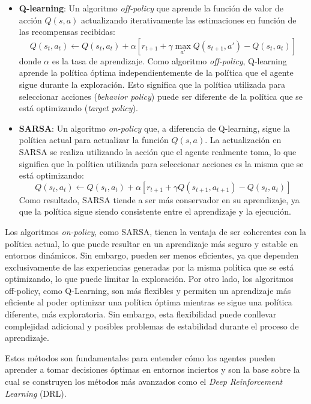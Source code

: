 \documentclass[a4paper,12pt]{report}
\begin{document}
\begin{itemize}
    \item \textbf{Q-learning}: Un algoritmo \textit{off-policy} que aprende la función de valor de 
    acción \(Q(s, a)\) actualizando iterativamente las estimaciones en función de las recompensas recibidas:
    \[
    Q(s_t, a_t) \leftarrow Q(s_t, a_t) + \alpha \left[r_{t+1} + \gamma \max_{a'} Q(s_{t+1}, a') - Q(s_t, a_t)\right]
    \]
    donde \(\alpha\) es la tasa de aprendizaje. Como algoritmo \textit{off-policy}, Q-learning aprende la 
    política óptima independientemente de la política que el agente sigue durante la exploración. 
    Esto significa que la política utilizada para seleccionar acciones (\textit{behavior policy}) 
    puede ser diferente de la política que se está optimizando (\textit{target policy}).

    \item \textbf{SARSA}: Un algoritmo \textit{on-policy} que, a diferencia de Q-learning, sigue la 
    política actual para actualizar la función \(Q(s, a)\). La actualización en SARSA se realiza 
    utilizando la acción que el agente realmente toma, lo que significa que la política utilizada 
    para seleccionar acciones es la misma que se está optimizando:
    \[
    Q(s_t, a_t) \leftarrow Q(s_t, a_t) + \alpha \left[r_{t+1} + \gamma Q(s_{t+1}, a_{t+1}) - Q(s_t, a_t)\right]
    \]
    Como resultado, SARSA tiende a ser más conservador en su aprendizaje, ya que la política sigue 
    siendo consistente entre el aprendizaje y la ejecución.

\end{itemize}


Los algoritmos \textit{on-policy}, como SARSA, tienen la ventaja de ser coherentes con la política 
actual, lo que puede resultar en un aprendizaje más seguro y estable en entornos dinámicos. Sin embargo, 
pueden ser menos eficientes, ya que dependen exclusivamente de las experiencias generadas por la misma 
política que se está optimizando, lo que puede limitar la exploración. Por otro lado, los algoritmos 
off-policy, como Q-Learning, son más flexibles y permiten un aprendizaje más eficiente al poder optimizar 
una política óptima mientras se sigue una política diferente, más exploratoria. Sin embargo, esta 
flexibilidad puede conllevar complejidad adicional y posibles problemas de estabilidad durante el 
proceso de aprendizaje.

Estos métodos son fundamentales para entender cómo los agentes pueden aprender a tomar decisiones 
óptimas en entornos inciertos y son la base sobre la cual se construyen los métodos más avanzados 
como el \textit{Deep Reinforcement Learning} (DRL).
\end{document}
